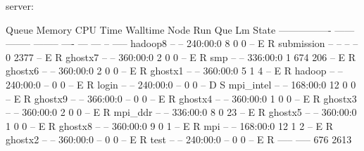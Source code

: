 \begin{prompt}
server: %

Queue            Memory CPU Time Walltime Node  Run Que Lm  State
---------------- ------ -------- -------- ----  --- --- --  -----
hadoop8            --      --    240:00:0     8   0   0 --   E R
submission         --      --       --      --    0 2377 --   E R
ghostx7            --      --    360:00:0     2   0   0 --   E R
smp                --      --    336:00:0     1 674 206 --   E R
ghostx6            --      --    360:00:0     2   0   0 --   E R
ghostx1            --      --    360:00:0     5   1   4 --   E R
hadoop             --      --    240:00:0   --    0   0 --   E R
login              --      --    240:00:0   --    0   0 --   D S
mpi_intel          --      --    168:00:0    12   0   0 --   E R
ghostx9            --      --    366:00:0   --    0   0 --   E R
ghostx4            --      --    360:00:0     1   0   0 --   E R
ghostx3            --      --    360:00:0     2   0   0 --   E R
mpi_ddr            --      --    336:00:0     8   0  23 --   E R
ghostx5            --      --    360:00:0     1   0   0 --   E R
ghostx8            --      --    360:00:0     9   0   1 --   E R
mpi                --      --    168:00:0    12   1   2 --   E R
ghostx2            --      --    360:00:0   --    0   0 --   E R
test               --      --    240:00:0   --    0   0 --   E R
                                               ----- -----
                                                 676  2613
\end{prompt}
